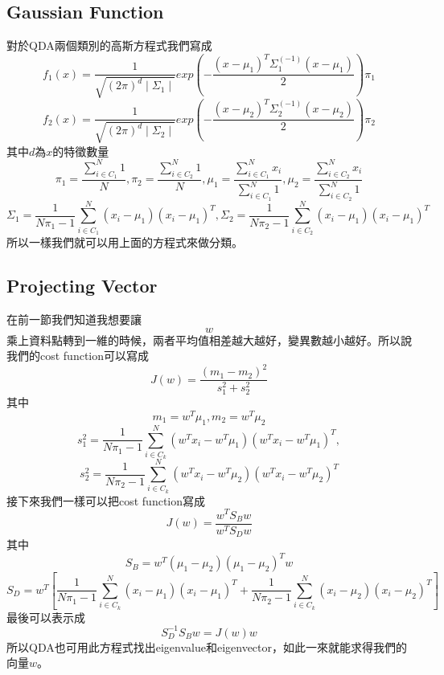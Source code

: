 \documentclass[12pt, a4paper]{article}
\begin{document}
\subsection{Gaussian Function}
對於QDA兩個類別的高斯方程式我們寫成
$$f_1(x)=\frac{1}{\sqrt{(2\pi)^d\mid\Sigma_1\mid}}exp\left(-\frac{(x-\mu_1)^T\Sigma_1^{(-1)}(x-\mu_1)}{2}\right)\pi_1$$
$$f_2(x)=\frac{1}{\sqrt{(2\pi)^d\mid\Sigma_2\mid}}exp\left(-\frac{(x-\mu_2)^T\Sigma_2^{(-1)}(x-\mu_2)}{2}\right)\pi_2$$
其中$d$為$x$的特徵數量
$$\pi_1=\frac{\sum_{i\in C_1}^N1}{N},\pi_2=\frac{\sum_{i\in C_2}^N1}{N},\mu_1=\frac{\sum_{i\in C_1}^Nx_i}{\sum_{i\in C_1}^N1},\mu_2=\frac{\sum_{i\in C_2}^Nx_i}{\sum_{i\in C_2}^N1}$$
$$\Sigma_1=\frac{1}{N\pi_1-1}\sum_{i\in C_1}^N(x_i-\mu_1)(x_i-\mu_1)^T,\Sigma_2=\frac{1}{N\pi_2-1}\sum_{i\in C_2}^N(x_i-\mu_1)(x_i-\mu_1)^T$$
所以一樣我們就可以用上面的方程式來做分類。
\subsection{Projecting Vector}
在前一節我們知道我想要讓$$w$$乘上資料點轉到一維的時候，兩者平均值相差越大越好，變異數越小越好。所以說我們的cost function可以寫成
$$J(w)=\frac{(m_1-m_2)^2}{s_1^2+s_2^2}$$
其中
$$m_1=w^T\mu_1,m_2=w^T\mu_2$$
$$s_1^2=\frac{1}{N\pi_1-1}\sum_{i\in C_k}^N(w^Tx_i-w^T\mu_1)(w^Tx_i-w^T\mu_1)^T,$$
$$s_2^2=\frac{1}{N\pi_2-1}\sum_{i\in C_k}^N(w^Tx_i-w^T\mu_2)(w^Tx_i-w^T\mu_2)^T$$
接下來我們一樣可以把cost function寫成
$$J(w)=\frac{w^TS_Bw}{w^TS_Dw}$$
其中
$$S_B=w^T(\mu_1-\mu_2)(\mu_1-\mu_2)^Tw$$
$$S_D=w^T\left[\frac{1}{N\pi_1-1}\sum_{i\in C_k}^N(x_i-\mu_1)(x_i-\mu_1)^T+\frac{1}{N\pi_2-1}\sum_{i\in C_k}^N(x_i-\mu_2)(x_i-\mu_2)^T\right]$$
最後可以表示成
$$S_D^{-1}S_Bw=J(w)w$$
所以QDA也可用此方程式找出eigenvalue和eigenvector，如此一來就能求得我們的向量$w$。
\end{document}
